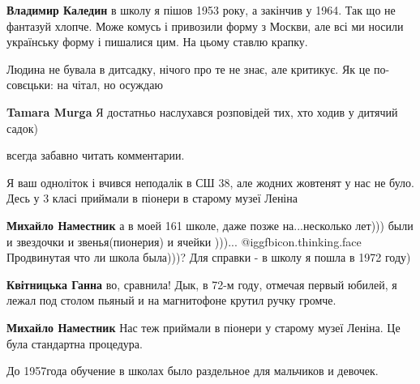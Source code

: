 \begin{itemize}
\begin{itemize}
\textbf{Владимир Каледин} в школу я пішов 1953 року, а закінчив у 1964. Так що не фантазуй хлопче. Може комусь і привозили форму з Москви, але всі ми носили українську форму і пишалися цим. На цьому ставлю крапку.
\end{itemize} %

Людина не бувала в дитсадку, нічого про те не знає, але критикує. Як це по-совєцьки: на чітал, но осуждаю

\textbf{Tamara Murga} Я достатньо наслухався розповідей тих, хто ходив у дитячий садок)

всегда забавно читать комментарии.


Я ваш одноліток і вчився неподалік в СШ 38, але жодних жовтенят у нас не було.
Десь у 3 класі приймали в піонери в старому музеї Леніна

\begin{itemize} %
\textbf{Михайло Наместник} а в моей 161 школе, даже позже на...несколько лет))) были и звездочки и звенья(пионерия) и ячейки )))...
 @igg{fbicon.thinking.face} Продвинутая что ли школа была)))?
Для справки - в школу я пошла в 1972 году)

\textbf{Квітницька Ганна} во, сравнила! Дык, в 72-м году, отмечая первый юбилей, я лежал под столом пьяный и на магнитофоне крутил ручку громче.

\textbf{Михайло Наместник} Нас теж приймали в піонери у старому музеї Леніна. Це була стандартна процедура.
\end{itemize} %

До 1957года обучение в школах было раздельное для мальчиков и девочек.

\end{itemize} %
